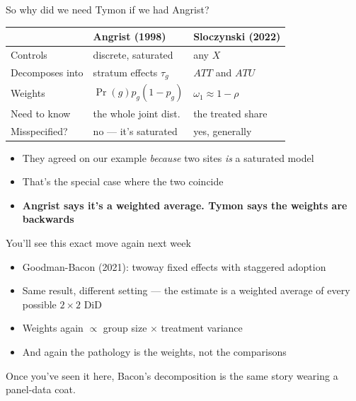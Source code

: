 \documentclass{beamer}
\newcommand{\highlight}[1]{\textcolor{accent}{\textbf{#1}}}
\newcommand{\deemph}[1]{\textcolor{warmgray}{\small #1}}
\begin{document}
\begin{frame}{So why did we need Tymon if we had Angrist?}

\centering
{\small
\begin{tabular}{lll}
\toprule
 & \textbf{Angrist (1998)} & \textbf{Sloczynski (2022)} \\
\midrule
Controls        & discrete, saturated      & any $X$ \\
Decomposes into & stratum effects $\tau_g$ & $ATT$ and $ATU$ \\
Weights         & $\Pr(g)p_g(1-p_g)$       & $\omega_1 \approx 1-\rho$ \\
Need to know    & the whole joint dist.    & the treated share \\
Misspecified?   & no --- it's saturated     & yes, generally \\
\bottomrule
\end{tabular}}

\vspace{0.9em}
\raggedright

\begin{itemize}
\item They agreed on our example \emph{because} two sites \emph{is} a saturated model
\item That's the special case where the two coincide
\item \highlight{Angrist says it's a weighted average. Tymon says the weights are backwards}
\end{itemize}

\end{frame}




\begin{frame}{You'll see this exact move again next week}

\begin{itemize}
\item Goodman-Bacon (2021): twoway fixed effects with staggered adoption
\item Same result, different setting --- the estimate is a weighted average of every
      possible $2\times 2$ DiD
\item Weights again $\propto$ group size $\times$ treatment variance
\item And again the pathology is the weights, not the comparisons
\end{itemize}

\vspace{0.6em}

\deemph{Once you've seen it here, Bacon's decomposition is the same story wearing a panel-data coat.}

\end{frame}
\end{document}

